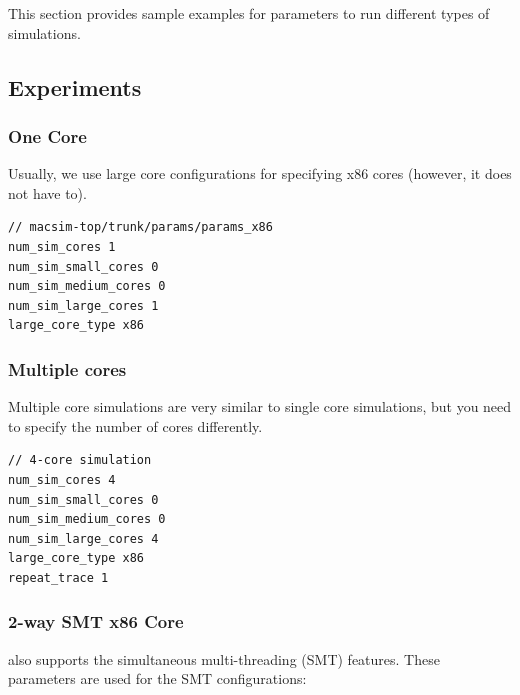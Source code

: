 This section provides sample examples for parameters to run different
types of simulations.



\subsection{\cpu Experiments}

\subsubsection{One \cpu Core}

Usually, we use large core configurations for specifying x86 cores
(however, it does not have to).

\begin{Verbatim}
// macsim-top/trunk/params/params_x86
num_sim_cores 1
num_sim_small_cores 0
num_sim_medium_cores 0
num_sim_large_cores 1
large_core_type x86
\end{Verbatim}


\subsubsection{Multiple \cpu cores}

Multiple core simulations are very similar to single core simulations,
but you need to specify the number of cores differently.


\begin{Verbatim}
// 4-core simulation
num_sim_cores 4
num_sim_small_cores 0
num_sim_medium_cores 0
num_sim_large_cores 4
large_core_type x86
repeat_trace 1
\end{Verbatim}



\subsubsection{2-way SMT x86 Core}

\SIM also supports the simultaneous multi-threading (SMT) features.
These parameters are used for the SMT configurations:

